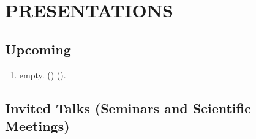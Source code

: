 \documentclass[11pt,letterpaper,pdf]{article}
\newcommand{\mycon}[1]{\smallskip\begin{enumerate}[resume,label={\scriptsize \arabic*$\ $},leftmargin=\parindent]\setlength{\itemsep}{#1}\vspace*{-0.7em}}
\newcommand{\ee}{\end{enumerate}}
\newcommand{\talk}[4]{%
  \item #1. (#2) {\it #3} (#4).}
\begin{document}
{%




\section*{PRESENTATIONS}


\subsection*{Upcoming}

\mycon{0.3em}
\talk{empty}{}{}{}
\ee

\subsection*{Invited Talks (Seminars and Scientific Meetings)}



}
\end{document}
